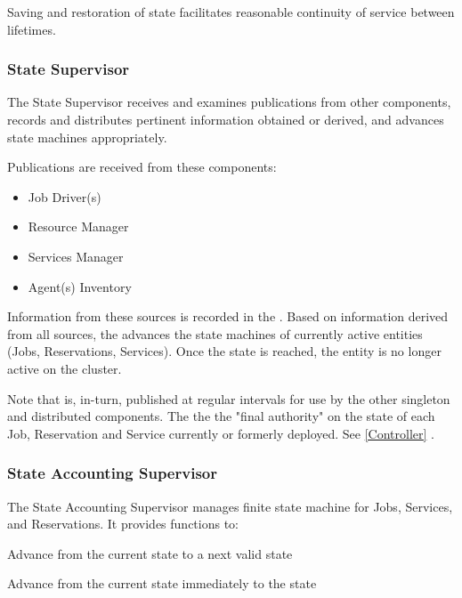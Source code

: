 \begin{itemize}
    Saving and restoration of state facilitates reasonable continuity of service
    between \varOrchestrator lifetimes.
    
    \subsubsection{State Supervisor} 

    The State Supervisor receives and examines publications from other
    \varDUCC components, records and distributes pertinent information obtained
    or derived, and advances state machines appropriately.
    
    Publications are received from these components:
    
    \begin{itemize}
    
    \item Job Driver(s)
    \item Resource Manager
    \item Services Manager
    \item Agent(s) Inventory
      
    \end{itemize} 
    
    Information from these sources is recorded in the \varORmap. 
    Based on information derived from all sources, the \varOrchestrator
    advances the state machines of currently active entities (Jobs,
    Reservations, Services). Once the \varCompleted state is reached, the
    entity is no longer active on the cluster.
    
    Note that \varORmap is, in-turn, published at regular intervals 
    for use by the other \varDUCC singleton and distributed components.
    The \varORmap the the "final authority" on the state of
    each Job, Reservation and Service currently or formerly deployed.
    See \ref{Controller} \varController.
    
    \subsubsection{State Accounting Supervisor} 
        
    The State Accounting Supervisor manages finite state machine for 
    Jobs, Services, and Reservations. It provides functions to:
    
    \begin{description}
    
    \item Advance from the current state to a next valid state
    \item Advance from the current state immediately to the \varCompleted state
          

\end{description}
\end{itemize}
